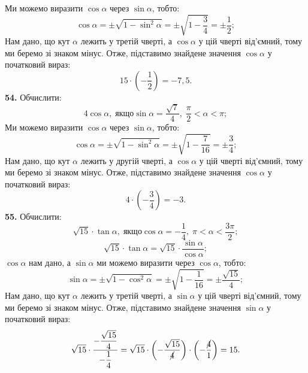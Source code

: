 Ми можемо виразити $\cos\alpha$ через $\sin\alpha$, тобто:
$$
\cos\alpha=\pm\sqrt{1-\sin^{2}\alpha}=\pm\sqrt{1-\dfrac{3}{4}}=\pm\dfrac{1}{2};
$$
Нам дано, що кут $\alpha$ лежить у третій чверті, а $\cos\alpha$ у цій чверті від'ємний, тому ми беремо зі знаком мінус. Отже, підставимо знайдене значення $\cos\alpha$ у початковий вираз:
$$
15\cdot\left(-\dfrac{1}{2}\right)=-7,5.
$$
\textbf{54.} Обчислити:
$$
4\cos\alpha, \; \mbox{якщо} \sin\alpha=\dfrac{\sqrt{7}}{4}, \; \dfrac{\pi}{2}<\alpha<\pi;
$$
Ми можемо виразити $\cos\alpha$ через $\sin\alpha$, тобто:
$$
\cos\alpha=\pm\sqrt{1-\sin^{2}\alpha}=\pm\sqrt{1-\dfrac{7}{16}}=\pm\dfrac{3}{4};
$$
Нам дано, що кут $\alpha$ лежить у другій чверті, а $\cos\alpha$ у цій чверті від'ємний, тому ми беремо зі знаком мінус. Отже, підставимо знайдене значення $\cos\alpha$ у початковий вираз:
$$
4\cdot\left(-\dfrac{3}{4}\right)=-3.
$$
\textbf{55.} Обчислити:
$$
\sqrt{15}\cdot\tan\alpha, \; \mbox{якщо} \cos\alpha=-\dfrac{1}{4}, \; \pi<\alpha<\dfrac{3\pi}{2};
$$
$$
\sqrt{15}\cdot\tan\alpha=\sqrt{15}\cdot\dfrac{\sin\alpha}{\cos\alpha};
$$
$\cos\alpha$ нам дано, а $\sin\alpha$ ми можемо виразити через $\cos\alpha$, тобто:
$$
\sin\alpha=\pm\sqrt{1-\cos^{2}\alpha}=\pm\sqrt{1-\dfrac{1}{16}}=\pm\dfrac{\sqrt{15}}{4};
$$
Нам дано, що кут $\alpha$ лежить у третій чверті, а $\sin\alpha$ у цій чверті від'ємний, тому ми беремо зі знаком мінус. Отже, підставимо знайдене значення $\sin\alpha$ у початковий вираз:
$$
\sqrt{15}\cdot\dfrac{-\dfrac{\sqrt{15}}{4}}{-\dfrac{1}{4}}=
\sqrt{15}\cdot\left(-\dfrac{\sqrt{15}}{\cancel{4}}\right)\cdot\left(-\dfrac{\cancel{4}}{1}\right)=15.
$$
